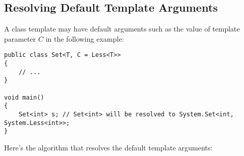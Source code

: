 \documentclass[a4paper,oneside,11pt]{book}
\theoremstyle{definition}
\begin{document}
\subsection{Resolving Default Template Arguments}

A class template may have default arguments such as the value of template parameter $C$ in the following example:

\lstset{language=Cmajor}
\begin{lstlisting}[frame=trBL]
public class Set<T, C = Less<T>>
{
    // ...
}

void main()
{
    Set<int> s; // Set<int> will be resolved to System.Set<int, System.Less<int>>;
}
\end{lstlisting}

Here's the algorithm that resolves the default template arguments:
\end{document}
